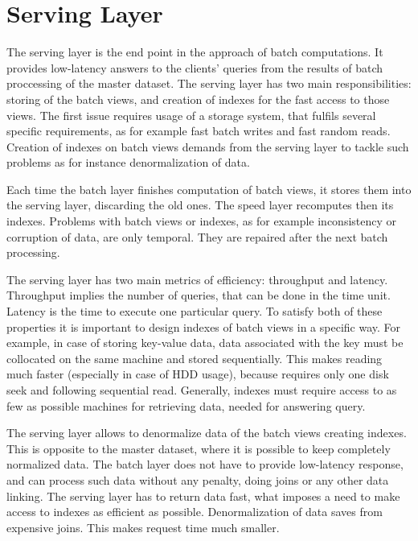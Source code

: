 \section{Serving Layer}

The serving layer is the end point in the approach of batch computations.
It provides low-latency answers to the clients' queries from the results of batch proccessing of the master dataset.
The serving layer has two main responsibilities: storing of the batch views, and creation of indexes for the fast access to those views.
The first issue requires usage of a storage system, that fulfils several specific requirements, as for example fast batch writes and fast random reads. 
Creation of indexes on batch views demands from the serving layer to tackle such problems as for instance denormalization of data.

Each time the batch layer finishes computation of batch views, it stores them into the serving layer, discarding the old ones.
The speed layer recomputes then its indexes.
Problems with batch views or indexes, as for example inconsistency or corruption of data, are only temporal.
They are repaired after the next batch processing.

The serving layer has two main metrics of efficiency: throughput and latency.
Throughput implies the number of queries, that can be done in the time unit.
Latency is the time to execute one particular query.
To satisfy both of these properties it is important to design indexes of batch views in a specific way.
For example, in case of storing key-value data, data associated with the key must be collocated on the same machine and stored sequentially.
This makes reading much faster (especially in case of HDD usage), because requires only one disk seek and following sequential read.
Generally, indexes must require access to as few as possible machines for retrieving data, needed for answering query.

The serving layer allows to denormalize data of the batch views creating indexes.
This is opposite to the master dataset, where it is possible to keep completely normalized data.
The batch layer does not have to provide low-latency response, and can process such data without any penalty, doing joins or any other data linking.
The serving layer has to return data fast, what imposes a need to make access to indexes as efficient as possible.
Denormalization of data saves from expensive joins.
This makes request time much smaller.

